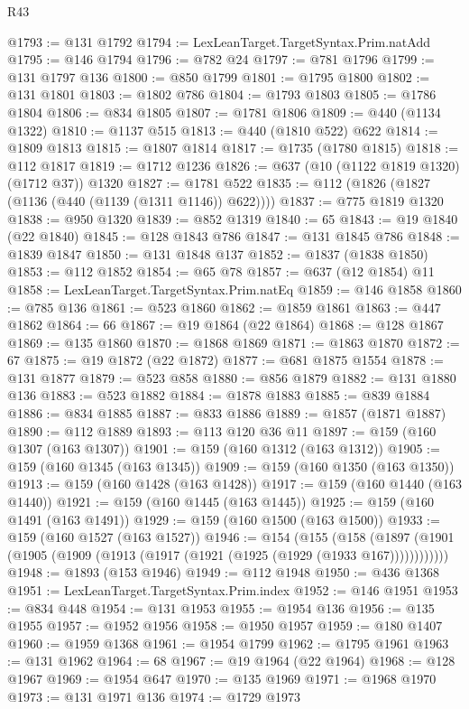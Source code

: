\begin{lexlean}{R43}
\begin{coremodule}
@1793 := @131 @1792
@1794 := LexLeanTarget.TargetSyntax.Prim.natAdd
@1795 := @146 @1794
@1796 := @782 @24
@1797 := @781 @1796
@1799 := @131 @1797 @136
@1800 := @850 @1799
@1801 := @1795 @1800
@1802 := @131 @1801
@1803 := @1802 @786
@1804 := @1793 @1803
@1805 := @1786 @1804
@1806 := @834 @1805
@1807 := @1781 @1806
@1809 := @440 (@1134 @1322)
@1810 := @1137 @515
@1813 := @440 (@1810 @522) @622
@1814 := @1809 @1813
@1815 := @1807 @1814
@1817 := @1735 (@1780 @1815)
@1818 := @112 @1817
@1819 := @1712 @1236
@1826 := @637 (@10 (@1122 @1819 @1320) (@1712 @37)) @1320
@1827 := @1781 @522
@1835 := @112 (@1826 (@1827 (@1136 (@440 (@1139 (@1311 @1146)) @622))))
@1837 := @775 @1819 @1320
@1838 := @950 @1320
@1839 := @852 @1319
@1840 := 65
@1843 := @19 @1840 (@22 @1840)
@1845 := @128 @1843 @786
@1847 := @131 @1845 @786
@1848 := @1839 @1847
@1850 := @131 @1848 @137
@1852 := @1837 (@1838 @1850)
@1853 := @112 @1852
@1854 := @65 @78
@1857 := @637 (@12 @1854) @11
@1858 := LexLeanTarget.TargetSyntax.Prim.natEq
@1859 := @146 @1858
@1860 := @785 @136
@1861 := @523 @1860
@1862 := @1859 @1861
@1863 := @447 @1862
@1864 := 66
@1867 := @19 @1864 (@22 @1864)
@1868 := @128 @1867
@1869 := @135 @1860
@1870 := @1868 @1869
@1871 := @1863 @1870
@1872 := 67
@1875 := @19 @1872 (@22 @1872)
@1877 := @681 @1875 @1554
@1878 := @131 @1877
@1879 := @523 @858
@1880 := @856 @1879
@1882 := @131 @1880 @136
@1883 := @523 @1882
@1884 := @1878 @1883
@1885 := @839 @1884
@1886 := @834 @1885
@1887 := @833 @1886
@1889 := @1857 (@1871 @1887)
@1890 := @112 @1889
@1893 := @113 @120 @36 @11
@1897 := @159 (@160 @1307 (@163 @1307))
@1901 := @159 (@160 @1312 (@163 @1312))
@1905 := @159 (@160 @1345 (@163 @1345))
@1909 := @159 (@160 @1350 (@163 @1350))
@1913 := @159 (@160 @1428 (@163 @1428))
@1917 := @159 (@160 @1440 (@163 @1440))
@1921 := @159 (@160 @1445 (@163 @1445))
@1925 := @159 (@160 @1491 (@163 @1491))
@1929 := @159 (@160 @1500 (@163 @1500))
@1933 := @159 (@160 @1527 (@163 @1527))
@1946 := @154
    (@155
      (@158 (@1897 (@1901 (@1905 (@1909 (@1913 (@1917 (@1921 (@1925 (@1929 (@1933 @167))))))))))))
@1948 := @1893 (@153 @1946)
@1949 := @112 @1948
@1950 := @436 @1368
@1951 := LexLeanTarget.TargetSyntax.Prim.index
@1952 := @146 @1951
@1953 := @834 @448
@1954 := @131 @1953
@1955 := @1954 @136
@1956 := @135 @1955
@1957 := @1952 @1956
@1958 := @1950 @1957
@1959 := @180 @1407
@1960 := @1959 @1368
@1961 := @1954 @1799
@1962 := @1795 @1961
@1963 := @131 @1962
@1964 := 68
@1967 := @19 @1964 (@22 @1964)
@1968 := @128 @1967
@1969 := @1954 @647
@1970 := @135 @1969
@1971 := @1968 @1970
@1973 := @131 @1971 @136
@1974 := @1729 @1973

\end{coremodule}
\end{lexlean}
